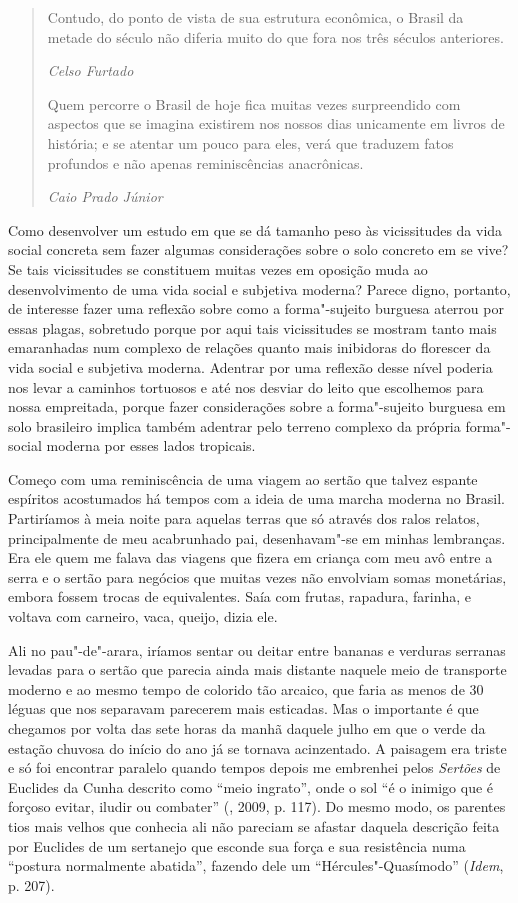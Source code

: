 \begin{quote}
Contudo, do ponto de vista de sua estrutura econômica, o Brasil da
metade do século  não diferia muito do que fora nos três séculos
anteriores.

\emph{Celso Furtado}

Quem percorre o Brasil de hoje fica muitas vezes surpreendido com
aspectos que se imagina existirem nos nossos dias unicamente em livros
de história; e se atentar um pouco para eles, verá que traduzem fatos
profundos e não apenas reminiscências anacrônicas.

\emph{Caio Prado Júnior }
\end{quote}

Como desenvolver um estudo em que se dá tamanho peso às vicissitudes da
vida social concreta sem fazer algumas considerações sobre o solo
concreto em se vive? Se tais vicissitudes se constituem muitas vezes em
oposição muda ao desenvolvimento de uma vida social e subjetiva moderna?
Parece digno, portanto, de interesse fazer uma reflexão sobre como a
forma"-sujeito burguesa aterrou por essas plagas, sobretudo porque por
aqui tais vicissitudes se mostram tanto mais emaranhadas num complexo de
relações quanto mais inibidoras do florescer da vida social e subjetiva
moderna. Adentrar por uma reflexão desse nível poderia nos levar a
caminhos tortuosos e até nos desviar do leito que escolhemos para nossa
empreitada, porque fazer considerações sobre a forma"-sujeito burguesa em
solo brasileiro implica também adentrar pelo terreno complexo da própria
forma"-social moderna por esses lados tropicais.

Começo com uma reminiscência de uma viagem ao sertão que talvez espante
espíritos acostumados há tempos com a ideia de uma marcha moderna no
Brasil. Partiríamos à meia noite para aquelas terras que só através dos
ralos relatos, principalmente de meu acabrunhado pai, desenhavam"-se em
minhas lembranças. Era ele quem me falava das viagens que fizera em
criança com meu avô entre a serra e o sertão para negócios que muitas
vezes não envolviam somas monetárias, embora fossem trocas de
equivalentes. Saía com frutas, rapadura, farinha, e voltava com
carneiro, vaca, queijo, dizia ele.

Ali no pau"-de"-arara, iríamos sentar ou deitar entre bananas e verduras
serranas levadas para o sertão que parecia ainda mais distante naquele
meio de transporte moderno e ao mesmo tempo de colorido tão arcaico, que
faria as menos de 30 léguas que nos separavam parecerem mais esticadas.
Mas o importante é que chegamos por volta das sete horas da manhã
daquele julho em que o verde da estação chuvosa do início do ano já se
tornava acinzentado. A paisagem era triste e só foi encontrar paralelo
quando tempos depois me embrenhei pelos \emph{Sertões} de Euclides da
Cunha descrito como ``meio ingrato'', onde o sol ``é o inimigo que é
forçoso evitar, iludir ou combater'' (, 2009, p. 117). Do mesmo
modo, os parentes tios mais velhos que conhecia ali não pareciam se
afastar daquela descrição feita por Euclides de um sertanejo que esconde
sua força e sua resistência numa ``postura normalmente abatida'',
fazendo dele um ``Hércules"-Quasímodo'' (\emph{Idem}, p. 207).

